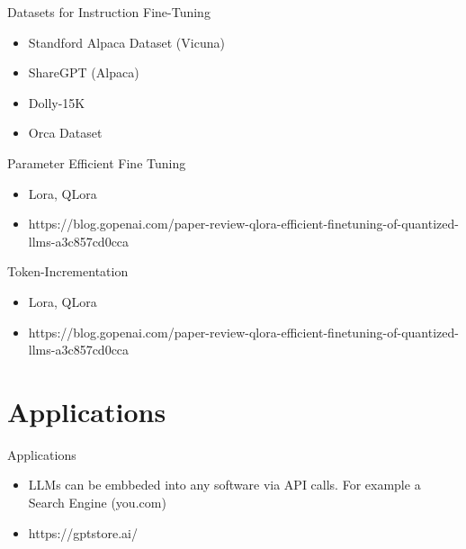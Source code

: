 \documentclass[handout]{beamer}
\begin{document}
\begin{frame}{Datasets for Instruction Fine-Tuning}
\begin{scriptsize}
\begin{itemize}
\item Standford Alpaca Dataset (Vicuna)
\item ShareGPT (Alpaca)
\item Dolly-15K
\item Orca Dataset
\end{itemize}
\end{scriptsize}
\end{frame}

\begin{frame}{Parameter Efficient Fine Tuning}
\begin{scriptsize}
\begin{itemize}
\item Lora, QLora
\item https://blog.gopenai.com/paper-review-qlora-efficient-finetuning-of-quantized-llms-a3c857cd0cca
\end{itemize}
\end{scriptsize}
\end{frame}

\begin{frame}{Token-Incrementation}
\begin{scriptsize}
\begin{itemize}
\item Lora, QLora
\item https://blog.gopenai.com/paper-review-qlora-efficient-finetuning-of-quantized-llms-a3c857cd0cca
\end{itemize}
\end{scriptsize}
\end{frame}




\section{Applications}

\begin{frame}{Applications}
\begin{scriptsize}
\begin{itemize}
\item LLMs can be embbeded into any software via API calls. For example a Search Engine (you.com)
\item https://gptstore.ai/
\end{itemize}
\end{scriptsize}
\end{frame}
\end{document}
